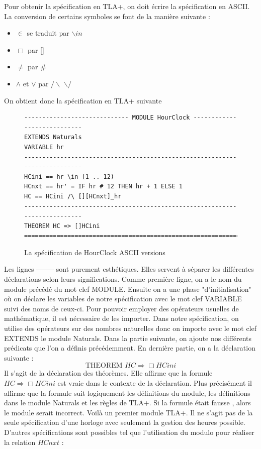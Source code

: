 \documentclass[12pt,a4paper]{article}
\begin{document}
Pour obtenir la spécification en TLA+, on doit écrire la spécification en ASCII. La conversion de certains symboles se font de la manière suivante :

\begin{itemize}
	\item $\in$ se traduit par $\backslash in$
	\item $\Box$ par []
	\item $\neq$ par \#
	\item $\land$ et $\lor$ par $/ \backslash$ $\backslash /$ 
\end{itemize}

On obtient donc la spécification en TLA+ suivante

\begin{figure}[ht]
\begin{lstlisting}[frame=single, basicstyle=\footnotesize]
----------------------------- MODULE HourClock ----------------------------
EXTENDS Naturals
VARIABLE hr
---------------------------------------------------------------------------
HCini == hr \in (1 .. 12)
HCnxt == hr' = IF hr # 12 THEN hr + 1 ELSE 1
HC == HCini /\ [][HCnxt]_hr
---------------------------------------------------------------------------
THEOREM HC => []HCini
===========================================================================

\end{lstlisting}
\caption{La spécification de HourClock ASCII versions}
\end{figure}

Les lignes -------- sont purement esthétiques. Elles servent à séparer les différentes déclarations selon leurs significations. Comme première ligne, on a le nom du module précédé du mot clef MODULE.
Ensuite on a une phase "d'initialisation" où on déclare les variables de notre spécification avec le mot clef VARIABLE suivi des noms de ceux-ci. Pour pouvoir employer des opérateurs usuelles de mathématique, il est nécessaire de les importer. Dans notre spécification, on utilise des opérateurs sur des nombres naturelles donc on importe avec le mot clef EXTENDS le module Naturals.
Dans la partie suivante, on ajoute nos différents prédicats que l'on a définis précédemment.
En dernière partie, on a la déclaration suivante :
$$ \text{THEOREM } HC \Rightarrow \Box HCini$$
Il s'agit de la déclaration des théorèmes. Elle affirme que la formule $HC \Rightarrow \Box HCini$ est vraie dans le contexte de la déclaration. Plus précisément il affirme que la formule suit logiquement les définitions du module, les définitions dans le module Naturals et les règles de TLA+. Si la formule était fausse , alors le module serait incorrect.
Voilà un premier module TLA+. Il ne s'agit pas de la seule spécification d'une horloge avec seulement la gestion des heures possible. D'autres spécifications sont possibles tel que l'utilisation du modulo pour réaliser la relation $HCnxt$ :
\end{document}
